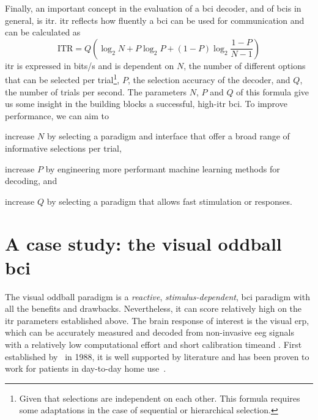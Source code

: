 Finally, an important concept in the evaluation of a \ac{bci} decoder, and of \acp{bci}
in general, is \ac{itr}.
\Ac{itr} reflects how fluently a \ac{bci} can be used for communication and can
be calculated as
\begin{equation}
	\text{ITR} = Q\left(\log_2N+P\log_2P+(1-P)\log_2\frac{1-P}{N-1}\right)
\end{equation}
\Ac{itr} is expressed in bits/s and is dependent on $N$, the number of
different options that can be selected per trial\footnote{Given that selections
are independent on each other. This formula requires some adaptations in the
case of sequential or hierarchical selection.}, $P$, the selection accuracy
of the decoder, and $Q$, the number of trials per second.
The parameters $N$, $P$ and $Q$ of this formula give us some insight in the
building blocks a successful, high-\ac{itr} \ac{bci}.
To improve performance, we can aim to
\begin{enumerate*}[label={\arabic*})]
\item increase $N$ by selecting a paradigm and interface that offer a
broad range of informative selections per trial,
\item increase $P$ by engineering more performant machine learning methods for
decoding, and
\item increase $Q$ by selecting a paradigm that allows fast stimulation or
responses.
\end{enumerate*}


\section{A case study: the visual oddball \acs{bci}}

The visual oddball paradigm is a \emph{reactive}, \emph{stimulus-dependent},
\ac{bci} paradigm with all the benefits and drawbacks.
Nevertheless, it can score relatively high on the \ac{itr} parameters established above.
The brain response of interest is the visual \ac{erp}, which can be accurately
measured and decoded from non-invasive \ac{eeg} signals with a relatively low
computational effort and short calibration timeand .
First established by~\cite{Farwell1988} in 1988, it is well supported by literature
and has been proven to work for patients in day-to-day home
use~\cite{Wolpaw2018}.

